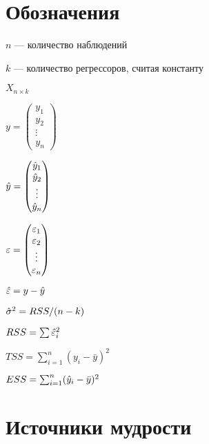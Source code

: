 \documentclass[11pt, openany]{book}
\theoremstyle{definition}
\begin{document}
\chapter{Обозначения}

$n$ — количество наблюдений

$k$ — количество регрессоров, считая константу

$X_{n\times k}$

$y=
\begin{pmatrix}
y_1 \\
y_2 \\
\vdots \\
y_n
\end{pmatrix}$

$\hat{y}=
\begin{pmatrix}
\hat{y}_1 \\
\hat{y}_2 \\
\vdots \\
\hat{y}_n
\end{pmatrix}$



$\varepsilon=
\begin{pmatrix}
\varepsilon_1 \\
\varepsilon_2 \\
\vdots \\
\varepsilon_n
\end{pmatrix}$

$\hat{\varepsilon}=y-\hat{y}$

$\hat{\sigma}^2=RSS/(n-k)$

$RSS=\sum \hat{\varepsilon}^2_i$

$TSS=\sum_{i=1}^n (y_i - \bar{y})^2$

$ESS=\sum_{i=1}^n (\hat{y}_i - \bar{y})^2$


\chapter{Источники мудрости}
\printbibliography[heading=none]




\listoftodos %
\end{document}
